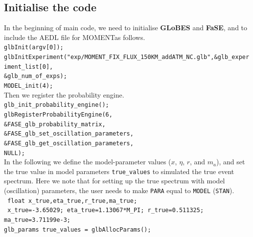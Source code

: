 \documentclass[aps,prd,nofootinbib,preprint]{revtex4}
\begin{document}
\subsection{Initialise the code}
In the beginning of main code, we need to initialise \textbf{GLoBES} and \textbf{FaSE}, and to include the AEDL file for MOMENTas follows.\vspace{0.2cm}\\ 
\texttt{glbInit(argv[0]);}\\
\texttt{glbInitExperiment("exp/MOMENT\_FIX\_FLUX\_150KM\_addATM\_NC.glb",\&glb\_experiment\_list[0],}\\
\texttt{\&glb\_num\_of\_exps);}\\
\texttt{MODEL\_init(4);}\vspace{0.2cm}\\
Then we register the probability engine.\vspace{0.2cm}\\
\texttt{glb\_init\_probability\_engine();}\\
\texttt{glbRegisterProbabilityEngine(6,\\
                                 \&FASE\_glb\_probability\_matrix,\\
                                 \&FASE\_glb\_set\_oscillation\_parameters,\\
                                 \&FASE\_glb\_get\_oscillation\_parameters,\\
                                 NULL); }\vspace{0.2cm}\\                                 
In the following we define the model-parameter values ($x$, $\eta$, $r$, and $m_a$), and set the true value in model parameters \texttt{true\_values} to simulated the true event spectrum. Here we note that for setting up the true spectrum with model (oscillation) parameters, the user needs to make \texttt{PARA} equal to \texttt{MODEL} (\texttt{STAN}).\vspace{0.2cm}\\
\texttt{     float x\_true,eta\_true,r\_true,ma\_true;}\\
\texttt{    x\_true=-3.65029; eta\_true=1.13067*M\_PI; r\_true=0.511325; ma\_true=3.71199e-3;}\\
%
\texttt{glb\_params true\_values = glbAllocParams();}\\
\end{document}
